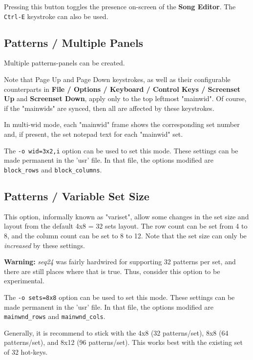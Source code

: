    Pressing this button toggles the presence on-screen of the
   \textbf{Song Editor}.  The \texttt{Ctrl-E} keystroke can also be used.

\subsection{Patterns / Multiple Panels}
\label{subsec:patterns_panel_multiple}

   Multiple patterns-panels can be created.

   Note that Page Up and Page Down keystrokes, as well as their
   configurable counterparts in
   \textbf{File / Options / Keyboard / Control Keys / Screenset Up}
   and \textbf{Screenset Down}, apply only to the top leftmost "mainwid".
   Of course, if the "mainwids" are synced, then all are affected by these
   keystrokes.

   In multi-wid mode, each "mainwid" frame shows the corresponding set number
   and, if present, the set notepad text for each "mainwid" set.

   The \texttt{-o wid=3x2,i} option can be used to set this mode.
   These settings can be made permanent in the 'usr' file.
   In that file, the options modified are \texttt{block\_rows} and
   \texttt{block\_columns}.

\subsection{Patterns / Variable Set Size}
\label{subsec:patterns_panel_variset}

   This option, informally known as "variset", allow some changes in
   the set size and layout from the default 4x8 = 32 sets layout.
   The row count can be set from 4 to 8, and the column count can be set to 8
   to 12.  Note that the set size can only be \textsl{increased} by these
   settings.

   \textbf{Warning:}
   \textsl{seq24} was fairly hardwired for supporting 32 patterns per
   set, and there are still places where that is true.  Thus,
   consider this option to be experimental.

   The \texttt{-o sets=8x8} option can be used to set this mode.
   These settings can be made permanent in the 'usr' file.
   In that file, the options modified are \texttt{mainwnd\_rows} and
   \texttt{mainwnd\_cols}.

   Generally, it is recommend to stick with the 4x8 (32 patterns/set),
   8x8 (64 patterns/set), and 8x12 (96 patterns/set).  This works best with the
   existing set of 32 hot-keys.

